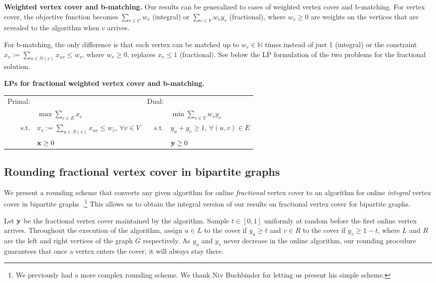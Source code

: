 \documentclass{article}
\newcommand{\bx}{{\bf{x}}}
\newcommand{\by}{{\bf{y}}}
\begin{document}
{\bf Weighted vertex cover and b-matching.} Our results can be generalized to cases of weighted vertex cover and b-matching.
For vertex cover, the objective function becomes $\sum_{v\in C}w_v$ (integral) or $\sum_{v\in V}w_vy_v$ (fractional), where $w_v\geq 0$ are weights on the vertices that are revealed to the algorithm when $v$ arrives.

For b-matching, the only difference is that each vertex can be matched up to $w_v\in\mathbb{N}$ times instead of just 1 (integral) or the constraint $x_v:=\sum_{u\in N(v)}x_{uv}\leq w_v$, where $w_v\geq 0$, replaces $x_v\leq 1$ (fractional). See below the LP formulation of the two problems for the fractional solution. 

{\bf LPs for fractional weighted vertex cover and b-matching.}

\begin{center}
\begin{tabular}{ | r l | r l | }
\hline
Primal: & & Dual: &\\
 & $\max\sum_{e\in E} x_e$ &  & $\min\sum_{v\in V}w_vy_v$ \\
s.t. & $ x_v:=\sum_{u\in N(v)} x_{uv}\leq w_v,\, \forall v\in V$ & s.t. & $y_u+y_v\geq 1,\, \forall (u,v)\in E$ \\
&  $\bx\geq 0$ & & $\by\geq 0$ \\
\hline
\end{tabular}
\end{center}




\subsection{Rounding fractional vertex cover in bipartite graphs}
\label{sec:rounding}
We present a rounding scheme that converts any given algorithm for online {\em fractional} vertex cover to an algorithm for online {\em integral} vertex cover in bipartite graphs~\cite{NivPersonal}.\footnote{We previously had a more complex rounding scheme. We thank Niv Buchbinder for letting us present his simple scheme.} This allows us to obtain the integral version of our results on fractional vertex cover for bipartite graphs.

Let ${\bf y}$ be the fractional vertex cover maintained by the algorithm. Sample $t\in [0,1]$ uniformly at random before the first online vertex arrives. Throughout the execution of the algorithm, assign $u\in L$  to the cover if $y_u\geq t$ and $v\in R$ to the cover if $y_v\geq 1-t$, where $L$ and $R$ are the left and right vertices of the graph $G$ respectively.
As $y_u$ and $y_v$ never decrease in the online algorithm, our rounding procedure guarantees that once a vertex enters the cover, it will always stay there. 
\end{document}
